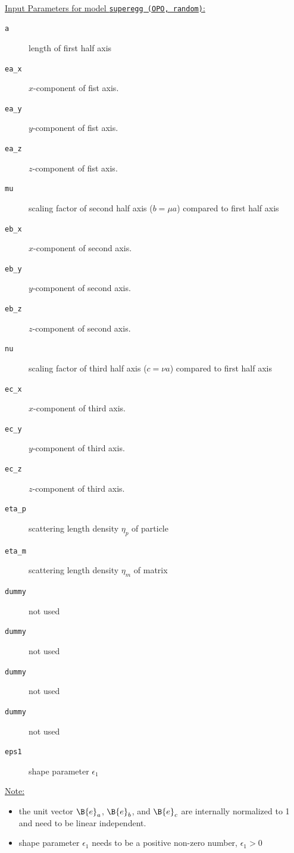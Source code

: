 ~\\
\uline{Input Parameters for model \texttt{superegg (OPO, random)}:}
\begin{description}
\item[\texttt{a}] length of first half axis
\item[\texttt{ea\_x}] $x$-component of fist axis.
\item[\texttt{ea\_y}] $y$-component of fist axis.
\item[\texttt{ea\_z}] $z$-component of fist axis.
\item[\texttt{mu}] scaling factor of second half axis ($b=\mu a$) compared to first half axis
\item[\texttt{eb\_x}] $x$-component of second axis.
\item[\texttt{eb\_y}] $y$-component of second axis.
\item[\texttt{eb\_z}] $z$-component of second axis.
\item[\texttt{nu}] scaling factor of third half axis ($c=\nu a$) compared to first half axis
\item[\texttt{ec\_x}] $x$-component of third axis.
\item[\texttt{ec\_y}] $y$-component of third axis.
\item[\texttt{ec\_z}] $z$-component of third axis.
\item[\texttt{eta\_p}] scattering length density $\eta_p$ of particle
\item[\texttt{eta\_m}] scattering length density $\eta_m$ of matrix
\item[\texttt{dummy}] not used
\item[\texttt{dummy}] not used
\item[\texttt{dummy}] not used
\item[\texttt{dummy}] not used
\item[\texttt{eps1}] shape parameter $\epsilon_1$
\end{description}

\noindent\uline{Note:}
\begin{itemize}
\item the unit vector $\B{e}_a$, $\B{e}_b$, and $\B{e}_c$ are internally normalized to 1 and need to be linear independent.
\item shape parameter $\epsilon_1$ needs to be a positive non-zero number, $\epsilon_1>0$
\end{itemize}

\clearpage
